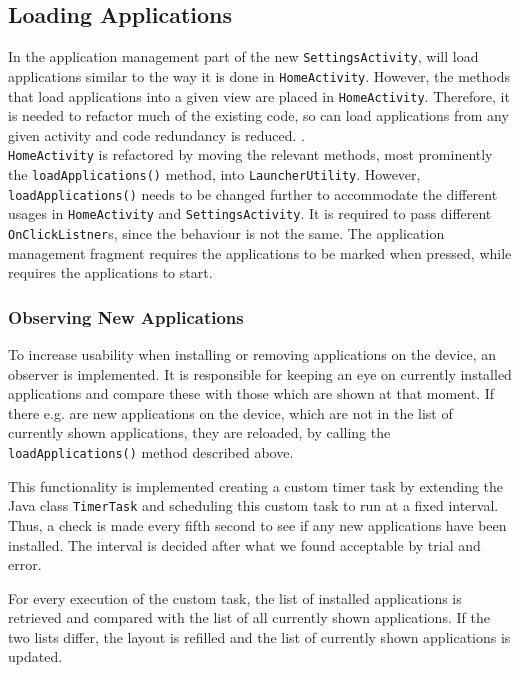 \subsection{Loading Applications}\label{sect:sprint3:refactoring}
In the application management part of the new \lstinline!SettingsActivity!, \launcher will load applications similar to the way it is done in \lstinline|HomeActivity|.
However, the methods that load applications into a given view are placed in \lstinline!HomeActivity!.
Therefore, it is needed to refactor much of the existing code, so \launcher can load applications from any given activity and code redundancy is reduced. .\\

\lstinline!HomeActivity! is refactored by moving the relevant methods, most prominently the \lstinline|loadApplications()| method, into \lstinline!LauncherUtility!.
However, \lstinline|loadApplications()| needs to be changed further to accommodate the different usages in \lstinline!HomeActivity! and \lstinline!SettingsActivity!. 
It is required to pass different \lstinline|OnClickListner|s, since the behaviour is not the same.
The application management fragment requires the applications to be marked when pressed, while \homeactivity requires the applications to start.

\subsubsection{Observing New Applications}\label{sec:sprint3:observing}
To increase usability when installing or removing applications on the device, an observer is implemented.
It is responsible for keeping an eye on currently installed applications and compare these with those which are shown at that moment. 
If there e.g. are new applications on the device, which are not in the list of currently shown applications, they are reloaded, by calling the \lstinline|loadApplications()| method described above.

This functionality is implemented creating a custom timer task by extending the Java class \lstinline!TimerTask! and scheduling this custom task to run at a fixed interval. 
Thus, a check is made every fifth second to see if any new applications have been installed.
The interval is decided after what we found acceptable by trial and error.

For every execution of the custom task, the list of installed applications is retrieved and compared with the list of all currently shown applications.
If the two lists differ, the layout is refilled and the list of currently shown applications is updated.